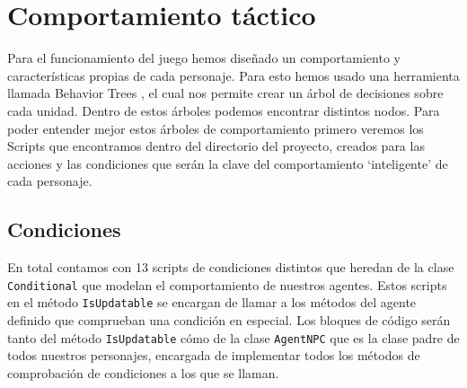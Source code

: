 \section{Comportamiento táctico}

Para el funcionamiento del juego hemos diseñado un comportamiento y características propias de cada personaje. Para esto hemos usado una herramienta llamada Behavior Trees \cite{uniBT}, el cual nos permite crear un árbol de decisiones sobre cada unidad. Dentro de estos árboles podemos encontrar distintos nodos. Para poder entender mejor estos árboles de comportamiento primero veremos los Scripts que encontramos dentro  del directorio  del proyecto, creados para las acciones y las condiciones que serán la clave del comportamiento `inteligente' de cada personaje.

\subsection{Condiciones}

En total contamos con 13 scripts de condiciones distintos que heredan de la clase \texttt{Conditional} que modelan el comportamiento de nuestros agentes. Estos scripts en el método \texttt{IsUpdatable} se encargan de llamar a los métodos del agente definido que comprueban una condición en especial. Los bloques de código serán tanto del método \texttt{IsUpdatable} cómo de la clase \texttt{AgentNPC} que es la clase padre de todos nuestros personajes, encargada de implementar todos los métodos de comprobación de condiciones a los que se llaman. 

